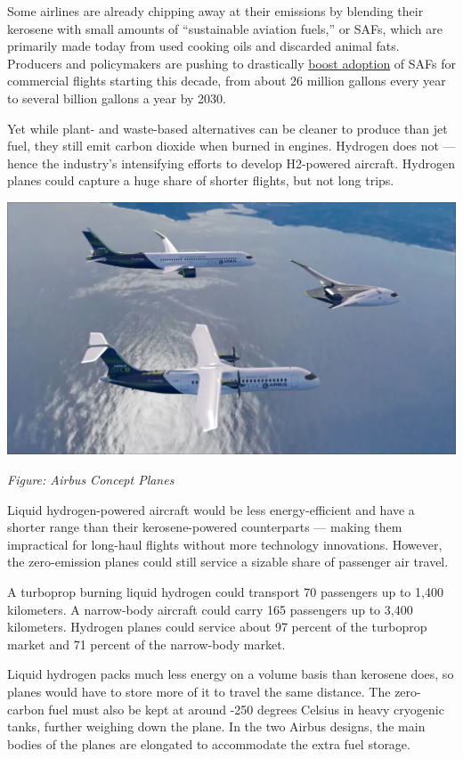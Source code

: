 \documentclass[
]{book}
\begin{document}
Some airlines are already chipping away at their emissions by blending their kerosene with small amounts of \hspace{0pt}``sustainable aviation fuels,'' or SAFs, which are primarily made today from used cooking oils and discarded animal fats. Producers and policymakers are pushing to drastically \href{https://www.canarymedia.com/articles/air-travel/how-do-we-clean-up-air-travel-fuel-from-fast-food-grease-is-just-the-start}{boost adoption} of SAFs for commercial flights starting this decade, from about 26 million gallons every year to several billion gallons a year by 2030.

Yet while plant- and waste-based alternatives can be cleaner to produce than jet fuel, they still emit carbon dioxide when burned in engines. Hydrogen does not --- hence the industry's intensifying efforts to develop H2-powered aircraft.
Hydrogen planes could capture a huge share of shorter flights, but not long trips.

\includegraphics{fig/airbus_hydrogen_concept.png}

\emph{Figure: Airbus Concept Planes}

Liquid hydrogen-powered aircraft would be less energy-efficient and have a shorter range than their kerosene-powered counterparts --- making them impractical for long-haul flights without more technology innovations. However, the zero-emission planes could still service a sizable share of passenger air travel.

A turboprop burning liquid hydrogen could transport 70 passengers up to 1,400 kilometers.
A narrow-body aircraft could carry 165 passengers up to 3,400 kilometers.
Hydrogen planes could service about 97 percent of the turboprop market and 71 percent of the narrow-body market.

Liquid hydrogen packs much less energy on a volume basis than kerosene does, so planes would have to store more of it to travel the same distance. The zero-carbon fuel must also be kept at around -250 degrees Celsius
in heavy cryogenic tanks, further weighing down the plane. In the two Airbus designs, the main bodies of the planes are elongated to accommodate the extra fuel storage.
\end{document}
